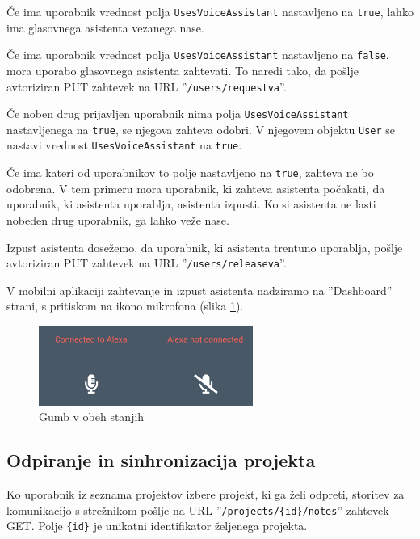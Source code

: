 \documentclass[a4paper, 12pt]{book}
\begin{document}
Če ima uporabnik vrednost polja \texttt{UsesVoiceAssistant} nastavljeno na \texttt{true}, lahko ima glasovnega asistenta vezanega nase.

Če ima uporabnik vrednost polja \texttt{UsesVoiceAssistant} nastavljeno na \texttt{false}, mora uporabo glasovnega asistenta zahtevati.
To naredi tako, da pošlje avtoriziran PUT zahtevek na URL ''\texttt{/users/requestva}''.

Če noben drug prijavljen uporabnik nima polja \texttt{UsesVoiceAssistant} nastavljenega na \texttt{true}, se njegova zahteva odobri.
V njegovem objektu \texttt{User} se nastavi vrednost \texttt{UsesVoiceAssistant} na \texttt{true}.

Če ima kateri od uporabnikov to polje nastavljeno na \texttt{true}, zahteva ne bo odobrena.
V tem primeru mora uporabnik, ki zahteva asistenta počakati, da uporabnik, ki asistenta uporablja, asistenta izpusti.
Ko si asistenta ne lasti nobeden drug uporabnik, ga lahko veže nase.

Izpust asistenta dosežemo, da uporabnik, ki asistenta trentuno uporablja, pošlje avtoriziran PUT zahtevek na URL ''\texttt{/users/releaseva}''.

V mobilni aplikaciji zahtevanje in izpust asistenta nadziramo na ''Dashboard'' strani, s pritiskom na ikono mikrofona (slika \ref{app_alexa_yesno}).

\begin{figure}[H]
\begin{center}
\includegraphics[width=7cm]{app_alexa_yesno}
\end{center}
	\caption{Gumb v obeh stanjih}
\label{app_alexa_yesno}
\end{figure}

\subsection{Odpiranje in sinhronizacija projekta}

Ko uporabnik iz seznama projektov izbere projekt, ki ga želi odpreti, storitev za komunikacijo s strežnikom pošlje na URL ''\texttt{/projects/\{id\}/notes}'' zahtevek GET.
Polje \texttt{\{id\}} je unikatni identifikator željenega projekta.
\end{document}
